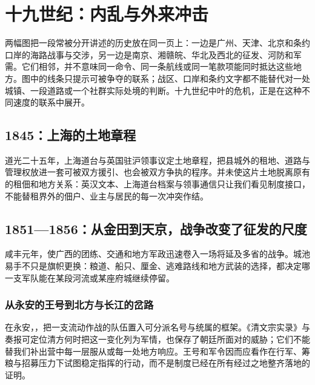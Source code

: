 \chapter{十九世纪：内乱与外来冲击}
\label{ch:nineteenth-century-conflicts}



\noindent 两幅图把一段常被分开讲述的历史放在同一页上：一边是广州、天津、北京和条约口岸的海路战事与交涉，另一边是南京、湘赣皖、华北及西北的征发、河防和军需。它们相邻，并不意味同一命令、同一条航线或同一笔款项能同时抵达这些地方。图中的线条只提示可被争夺的联系；战区、口岸和条约文字都不能替代对一处城镇、一段道路或一个社群实际处境的判断。十九世纪中叶的危机，正是在这种不同速度的联系中展开。

\section{1845：上海的土地章程}

道光二十五年，上海道台与英国驻沪领事议定土地章程，把县城外的租地、道路与管理权放进一套可被双方援引、也会被双方争执的程序。并未使这片土地脱离原有的租佃和地方关系：英汉文本、上海道台档案与领事通信只让我们看见制度接口，不能替租界外的佃户、业主与居民的每一次冲突作结。

\section{1851—1856：从金田到天京，战争改变了征发的尺度}

咸丰元年，使广西的团练、交通和地方军政迅速卷入一场将延及多省的战争。城池易手不只是旗帜更换：粮道、船只、厘金、逃难路线和地方武装的选择，都决定哪一支军队能在某段河流或某座府城继续停留。

\subsection{从永安的王号到北方与长江的岔路}

在永安，，把一支流动作战的队伍置入可分派名号与统属的框架。《清文宗实录》与奏报可定位清方何时把这一变化列为军情，也保存了朝廷所面对的威胁；它们不能替我们补出营中每一层服从或每一处地方响应。王号和军令因而应看作在行军、筹粮与招募压力下试图稳定指挥的行动，而不是制度已经在所有经过之地整齐落地的证明。

